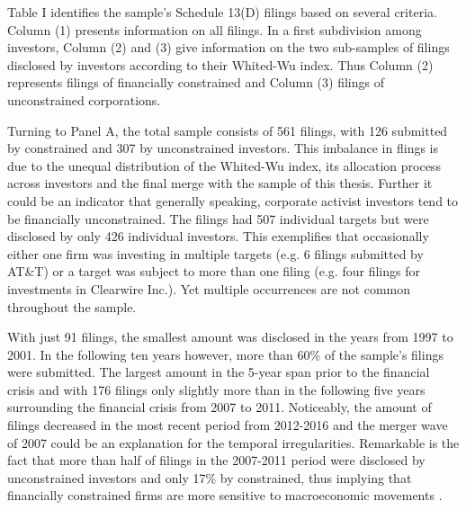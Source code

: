 \documentclass[12pt]{article}
\begin{document}
\noindent Table I identifies the sample's Schedule 13(D) filings based on several criteria. Column (1) presents information on all filings. In a first subdivision among investors, Column (2) and (3) give information on the two sub-samples of filings disclosed by investors according to their Whited-Wu index. Thus Column (2) represents filings of financially constrained and Column (3) filings of unconstrained corporations.\par
Turning to Panel A, the total sample consists of 561 filings, with 126 submitted by constrained and 307 by unconstrained investors. This imbalance in flings is due to the unequal distribution of the Whited-Wu index, its allocation process across investors and the final merge with the sample of this thesis. Further it could be an indicator that generally speaking, corporate activist investors tend to be financially unconstrained. The filings had 507 individual targets but were disclosed by only 426 individual investors. This exemplifies that occasionally either one firm was investing in multiple targets (e.g. 6 filings submitted by AT\&T) or a target was subject to more than one filing (e.g. four filings for investments in Clearwire Inc.). Yet multiple occurrences are not common throughout the sample.\par
With just 91 filings, the smallest amount was disclosed in the years from 1997 to 2001. In the following ten years however, more than 60\% of the sample's filings were submitted. The largest amount in the 5-year span prior to the financial crisis and with 176 filings only slightly more than in the following five years surrounding the financial crisis from 2007 to 2011. Noticeably, the amount of filings decreased in the most recent period from 2012-2016 and the merger wave of 2007 \citep[p.19]{Huang2017} could be an explanation for the temporal irregularities. Remarkable is the fact that more than half of filings in the 2007-2011 period were disclosed by unconstrained investors and only 17\% by constrained, thus implying that financially constrained firms are more sensitive to macroeconomic movements \citep[p.1197]{Campello2006}.\par
\end{document}
